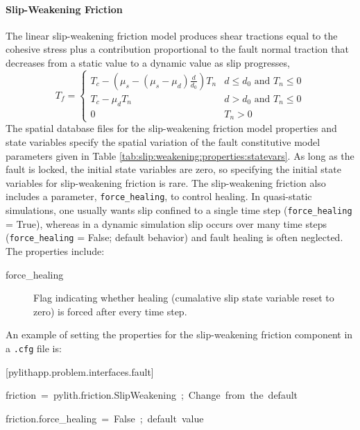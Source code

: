 \paragraph{\label{sec:friction:slip:weakening}Slip-Weakening Friction}

The linear slip-weakening friction model produces shear tractions
equal to the cohesive stress plus a contribution proportional to the
fault normal traction that decreases from a static value to a dynamic
value as slip progresses,
\begin{equation}
T_{f}=\begin{cases}
T_{c}-(\mu_{s}-(\mu_{s}-\mu_{d})\frac{d}{d_{0}})T_{n} & d\leq d_{0}\text{ and }T_{n}\leq0\\
T_{c}-\mu_{d}T_{n} & d>d_{0}\text{ and }T_{n}\leq0\\
0 & T_{n}>0
\end{cases}
\end{equation}
The spatial database files for the slip-weakening friction model properties
and state variables specify the spatial variation of the fault constitutive
model parameters given in Table \vref{tab:slip:weakening:properties:statevars}.
As long as the fault is locked, the initial state variables are zero,
so specifying the initial state variables for slip-weakening friction
is rare. The slip-weakening friction also includes a parameter, \texttt{force\_healing},
to control healing. In quasi-static simulations, one usually wants
slip confined to a single time step (\texttt{force\_healing} = True),
whereas in a dynamic simulation slip occurs over many time steps (\texttt{force\_healing}
= False; default behavior) and fault healing is often neglected. The
properties include:
\begin{description}
\item [{force\_healing}] Flag indicating whether healing (cumalative slip
state variable reset to zero) is forced after every time step.
\end{description}
An example of setting the properties for the slip-weakening friction
component in a \texttt{.cfg} file is:
\begin{lyxcode}
{[}pylithapp.problem.interfaces.fault{]}

friction~=~pylith.friction.SlipWeakening~;~Change~from~the~default

friction.force\_healing~=~False~;~default~value
\end{lyxcode}
